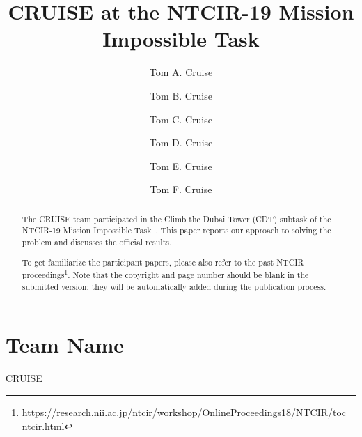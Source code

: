 \documentclass[sigconf,article]{acmart}
\begin{document}
\title{CRUISE at the NTCIR-19 Mission Impossible Task}

\author{Tom A. Cruise}
\author{Tom B. Cruise}
\author{Tom C. Cruise}
\author{Tom D. Cruise}
\author{Tom E. Cruise}
\author{Tom F. Cruise}


\begin{abstract}
The CRUISE team participated in the Climb the Dubai Tower (CDT) subtask of the NTCIR-19 Mission Impossible Task~\cite{mioverview}. This paper reports our approach to solving the problem and discusses the official results.

To get familiarize the participant papers, please also refer to the past NTCIR proceedings\footnote{\url{https://research.nii.ac.jp/ntcir/workshop/OnlineProceedings18/NTCIR/toc_ntcir.html}}. Note that the copyright and page number should be blank in the submitted version; they will be automatically added during the publication process. 
\end{abstract}


\maketitle
\pagestyle{plain} %

\section*{Team Name} %
CRUISE
\end{document}
